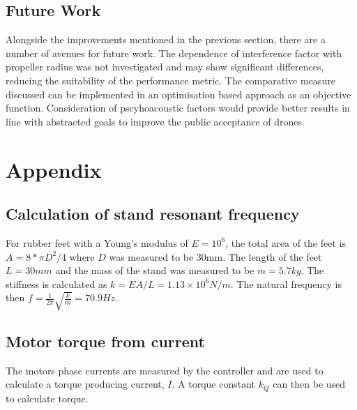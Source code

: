 \documentclass[12pt,a4paper]{article}
\begin{document}

\subsection{Future Work}
Alongside the improvements mentioned in the previous section, there are a number of avenues for future work.
The dependence of interference factor with propeller radius was not investigated and may show significant differences,
reducing the suitability of the performance metric.
The comparative measure discussed can be implemented in an optimisation based approach as an objective function.
Consideration of pscyhoacoustic factors would provide better results in line with abstracted goals to improve the public acceptance of drones.


\section{Appendix}

\subsection{Calculation of stand resonant frequency \label{sec:appendix_stand_frequency}}

For rubber feet with a Young's modulus of $E = 10^6$, the total area of the feet is $A = 8 * \pi D^2/4$ where $D$ was measured to be 30mm.
The length of the feet $L=30mm$ and the mass of the stand was measured to be $m=5.7kg$.
The stiffness is calculated as $k = EA/L = 1.13 \times 10^6 N/m$.
The natural frequency is then $f = \frac{1}{2\pi} \sqrt{\frac{k}{m}} = 70.9 Hz$.


\subsection{Motor torque from current \label{sec:appendix_motor_calibration}}

The motors phase currents are measured by the controller and are used to calculate a torque producing current, $I$.
A torque constant $k_Q$ can then be used to calculate torque.
\end{document}
